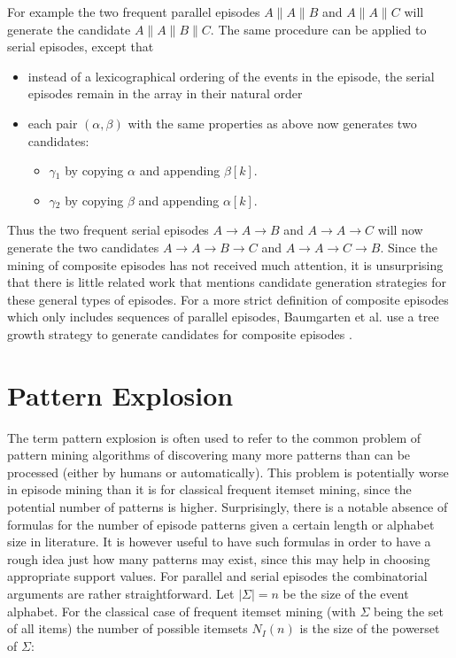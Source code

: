For example the two frequent parallel episodes $A \| A \| B$ and $A \| A \| C$ will generate the candidate $A \| A \| B \| C$. \newline
The same procedure can be applied to serial episodes, except that
\begin{itemize}
	\item instead of a lexicographical ordering of the events in the episode, the serial episodes remain in the array in their natural order
	\item each pair $(\alpha , \beta )$ with the same properties as above now generates two candidates:
	\begin{itemize}
		\item $\gamma{_1}$ by copying $\alpha$ and appending $\beta [k]$.
		\item $\gamma{_2}$ by copying $\beta$ and appending $\alpha [k]$.
	\end{itemize}
\end{itemize}

Thus the two frequent serial episodes $A \rightarrow A \rightarrow B$ and $A \rightarrow A \rightarrow C$ will now generate the two candidates $A \rightarrow A \rightarrow B \rightarrow C$ and $A \rightarrow A \rightarrow C \rightarrow B$. \newline
Since the mining of composite episodes has not received much attention, it is unsurprising that there is little related work that mentions candidate generation strategies for these general types of episodes. For a more strict definition of composite episodes which only includes sequences of parallel episodes, Baumgarten et al. use a tree growth strategy to generate candidates for composite episodes \cite{baumgarten2003tree}. 

\section{Pattern Explosion}
\label{sec_PatternExplosion}
The term pattern explosion is often used to refer to the common problem of pattern mining algorithms of discovering many more patterns than can be processed (either by humans or automatically). This problem is potentially worse in episode mining than it is for classical frequent itemset mining, since the potential number of patterns is higher. Surprisingly, there is a notable absence of formulas for the number of episode patterns given a certain length or alphabet size in literature. It is however useful to have such formulas in order to have a rough idea just how many patterns may exist, since this may help in choosing appropriate support values. For parallel and serial episodes the combinatorial arguments are rather straightforward. Let $|\Sigma| = n$ be the size of the event alphabet. For the classical case of frequent itemset mining (with $\Sigma$ being the set of all items) the number of possible itemsets $N_I(n)$ is the size of the powerset of $\Sigma$:

